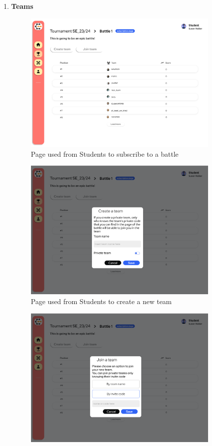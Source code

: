 \begin{enumerate}[label=\textbf{F\arabic*)}]
    \item \textbf{Teams}\\
    \begin{figure}[H]
        \centering
        \includegraphics[width=0.9\textwidth]{Mockups/11_student_battle_subscription.png}
        \caption{Page used from Students to subscribe to a battle}
    \end{figure}
    \begin{figure}[H]
        \centering
        \includegraphics[width=0.9\textwidth]{Mockups/12_student_create_team.png}
        \caption{Page used from Students to create a new team}
    \end{figure}
    \begin{figure}[H]
        \centering
        \includegraphics[width=0.9\textwidth]{Mockups/13_student_join_team.png}

\end{figure}
\end{enumerate}
